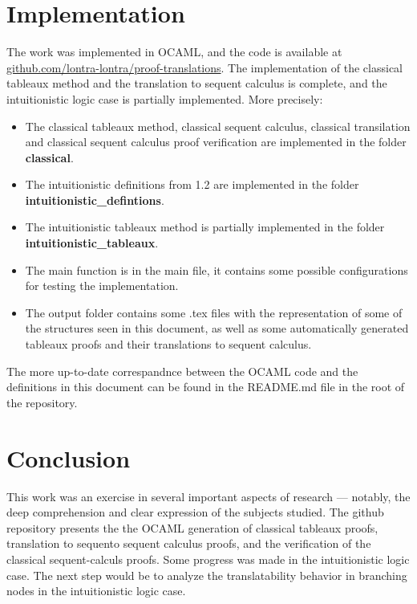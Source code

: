 \documentclass[runningheads]{llncs}
\begin{document}
\section{Implementation}
    The work was implemented in OCAML, and the code is available at \url{github.com/lontra-lontra/proof-translations}.
    The implementation of the classical tableaux method and the translation to sequent calculus is complete, and the intuitionistic logic case is partially implemented.
    More precisely:
    \begin{itemize}
        \item The classical tableaux method, classical sequent calculus, classical transilation and classical sequent calculus proof verification are implemented in the folder \textbf{classical}. 
        \item The intuitionistic definitions from 1.2 are implemented in the folder \textbf{intuitionistic\_defintions}.
        \item The intuitionistic tableaux method is partially implemented in the folder \textbf{intuitionistic\_tableaux}.
        \item The main function is in the main file, it contains some possible configurations for testing the implementation.
        \item The output folder contains some .tex files with the representation of some of the structures seen in this document, as well as some automatically generated tableaux proofs and their translations to sequent calculus.
    \end{itemize}
    The more up-to-date correspandnce between the OCAML code and the definitions in this document can be found in the README.md file in the root of the repository.
%
%
%
% 
% 
%
\section{ Conclusion}
    This work was an exercise in several important aspects of research — notably,
     the deep comprehension and clear expression of the subjects studied. The github repository presents the 
     the OCAML generation of classical tableaux proofs, translation to sequento sequent calculus proofs, and the verification of the classical sequent-calculs proofs. Some
     progress was made in the intuitionistic logic case.
     The next step would be to analyze the translatability behavior in branching nodes in the intuitionistic logic case.
\end{document}
